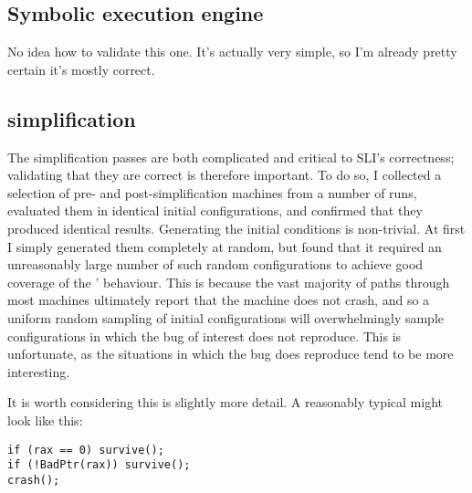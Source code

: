 \subsection{Symbolic execution engine}

No idea how to validate this one.  It's actually very simple, so I'm
already pretty certain it's mostly correct.

\subsection{{\STateMachine} simplification}



The {\StateMachine} simplification passes are both complicated and
critical to SLI's correctness; validating that they are correct is
therefore important.  To do so, I collected a selection of pre- and
post-simplification machines from a number of runs, evaluated them in
identical initial configurations, and confirmed that they produced
identical results.  Generating the initial conditions is non-trivial.
At first I simply generated them completely at random, but found that
it required an unreasonably large number of such random configurations
to achieve good coverage of the \StateMachines' behaviour.  This is
because the vast majority of paths through most machines ultimately
report that the machine does not crash, and so a uniform random
sampling of initial configurations will overwhelmingly sample
configurations in which the bug of interest does not reproduce.  This
is unfortunate, as the situations in which the bug does reproduce tend
to be more interesting.

It is worth considering this is slightly more detail.  A reasonably
typical \StateMachine might look like this:

\begin{verbatim}
if (rax == 0) survive();
if (!BadPtr(rax)) survive();
crash();
\end{verbatim}

